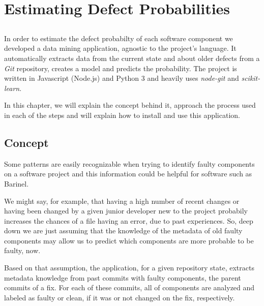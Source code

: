 \chapter{Estimating Defect Probabilities} \label{chap:estimating-dp}

\section*{}

In order to estimate the defect probabilty of each software component we developed a data mining application, agnostic to the project's language. 
It automatically extracts data from the current state and about older defects from a \emph{Git} repository, creates a model and predicts the probability. The project is written in Javascript (Node.js) and Python 3 and heavily uses \emph{node-git}
and \emph{scikit-learn}.

In this chapter, we will explain the concept behind it, approach the process used in each of the steps and will explain how to install and use this application.

\section{Concept}

Some patterns are easily recognizable when trying to identify faulty components on a software project and this information could be helpful for software such as Barinel. 

We might say, for example, that having a high number of recent changes or having been changed by a given junior developer new to the project probabily increases the chances of a file having an error, due to past experiences. So, deep down we are just assuming that the knowledge of the metadata of old faulty components may allow us to predict which components are more probable to be faulty, now.

Based on that assumption, the application, for a given repository state, extracts metadata knowledge from past commits with faulty components, the parent commits of a fix. For each of these commits, all of components are analyzed and labeled as faulty or clean, if it was or not changed on the fix, respectively.
%
%

